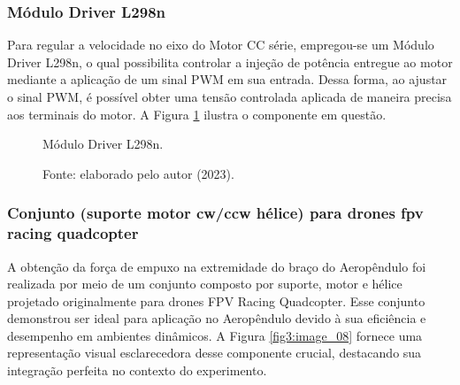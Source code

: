 \subsubsection{Módulo Driver L298n}
\label{driver_l298n}

Para regular a velocidade no eixo do Motor CC série, empregou-se um Módulo Driver L298n, o qual possibilita controlar a injeção de potência entregue ao motor mediante a aplicação de um sinal PWM em sua entrada. Dessa forma, ao ajustar o sinal PWM, é possível obter uma tensão controlada aplicada de maneira precisa aos terminais do motor. A Figura \ref{fig3:image_07} ilustra o componente em questão.

\begin{figure}[!h]
	\centering
	\caption{Módulo Driver L298n.}
	\caption*{Fonte: elaborado pelo autor (2023).}
	\label{fig3:image_07}
\end{figure}


\subsubsection{Conjunto (suporte motor cw/ccw hélice) para drones fpv racing quadcopter}


A obtenção da força de empuxo na extremidade do braço do Aeropêndulo foi realizada por meio de um conjunto composto por suporte, motor e hélice projetado originalmente para drones FPV Racing Quadcopter. Esse conjunto demonstrou ser ideal para aplicação no Aeropêndulo devido à sua eficiência e desempenho em ambientes dinâmicos. A Figura \ref{fig3:image_08} fornece uma representação visual esclarecedora desse componente crucial, destacando sua integração perfeita no contexto do experimento.


